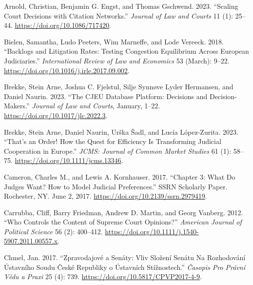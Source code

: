 \documentclass[
  11pt,
]{article}
\newlength{\cslhangindent}
\newenvironment{CSLReferences}[2] %
 {%
  \setlength{\parindent}{0pt}
  \ifodd #1 \everypar{\setlength{\hangindent}{\cslhangindent}}\ignorespaces\fi
  \ifnum #2 > 0
  \setlength{\parskip}{#2\baselineskip}
  \fi
 }%
 {}
\begin{document}
\hypertarget{refs}{}
\begin{CSLReferences}{1}{0}
\leavevmode{}%
Arnold, Christian, Benjamin G. Engst, and Thomas Gschwend. 2023.
{``Scaling {Court Decisions} with {Citation Networks}.''} \emph{Journal
of Law and Courts} 11 (1): 25--44. \url{https://doi.org/10.1086/717420}.

\leavevmode{}%
Bielen, Samantha, Ludo Peeters, Wim Marneffe, and Lode Vereeck. 2018.
{``Backlogs and Litigation Rates: {Testing} Congestion Equilibrium
Across {European} Judiciaries.''} \emph{International Review of Law and
Economics} 53 (March): 9--22.
\url{https://doi.org/10.1016/j.irle.2017.09.002}.

\leavevmode{}%
Brekke, Stein Arne, Joshua C. Fjelstul, Silje Synnøve Lyder Hermansen,
and Daniel Naurin. 2023. {``The {CJEU Database Platform}: {Decisions}
and {Decision-Makers}.''} \emph{Journal of Law and Courts}, January,
1--22. \url{https://doi.org/10.1017/jlc.2022.3}.

\leavevmode{}%
Brekke, Stein Arne, Daniel Naurin, Urška Šadl, and Lucía López-Zurita.
2023. {``That's an {Order}! {How} the {Quest} for {Efficiency Is
Transforming Judicial Cooperation} in {Europe}.''} \emph{JCMS: Journal
of Common Market Studies} 61 (1): 58--75.
\url{https://doi.org/10.1111/jcms.13346}.

\leavevmode{}%
Cameron, Charles M., and Lewis A. Kornhauser. 2017. {``Chapter 3: {What
Do Judges Want}? {How} to {Model Judicial Preferences}.''} SSRN
Scholarly Paper. {Rochester, NY}. June 2, 2017.
\url{https://doi.org/10.2139/ssrn.2979419}.

\leavevmode{}%
Carrubba, Cliff, Barry Friedman, Andrew D. Martin, and Georg Vanberg.
2012. {``Who {Controls} the {Content} of {Supreme Court Opinions}?''}
\emph{American Journal of Political Science} 56 (2): 400--412.
\url{https://doi.org/10.1111/j.1540-5907.2011.00557.x}.

\leavevmode{}%
Chmel, Jan. 2017. {``Zpravodajové a Senáty: {Vliv} Složení Senátu Na
Rozhodování {Ústavního} Soudu {České} Republiky o Ústavních
Stížnostech.''} \emph{Časopis Pro Právní Vědu a Praxi} 25 (4): 739.
\url{https://doi.org/10.5817/CPVP2017-4-9}.


\end{CSLReferences}
\end{document}
